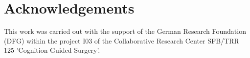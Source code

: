 \documentclass[a4paper, 11pt, twoside]{article}
\theoremstyle{plain}
\theoremstyle{definition}
\begin{document}

\section{Acknowledgements}
\label{sec:acknowledgements}

This work was carried out with the support of the German Research Foundation (DFG) within the project I03 of the Collaborative Research Center SFB/TRR 125 'Cognition-Guided Surgery'.




\newpage
\appendix




\printindex
\end{document}
